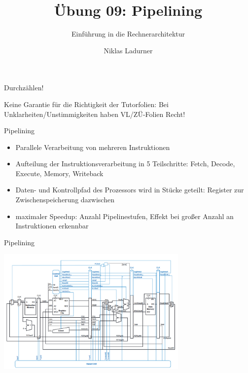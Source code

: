 \documentclass[
  german,            %
  aspectratio=169,    %
]{tumbeamer}
\title{Übung 09: Pipelining}
\subtitle{Einführung in die Rechnerarchitektur}
\author{Niklas Ladurner}
\institute{\theChairName\\\theDepartmentName\\\theUniversityName}
\date{\DTMdisplaydate{2023}{12}{15}{-1}}
\begin{document}
\maketitle

\begin{frame}[c]{}{}
  \begin{center}
    \LARGE  Durchzählen!
  \end{center}
\end{frame}

\begin{frame}[c]{}{}
  \begin{center}
    \LARGE  Keine Garantie für die Richtigkeit der Tutorfolien: Bei Unklarheiten/Unstimmigkeiten
    haben VL/ZÜ-Folien Recht!
  \end{center}
\end{frame}

\begin{frame}[fragile, c]{Pipelining}{}
  \begin{itemize}
    \item Parallele Verarbeitung von mehreren Instruktionen
    \item Aufteilung der Instruktionsverarbeitung in 5 Teilschritte: Fetch, Decode, Execute, Memory, Writeback
    \item Daten- und Kontrollpfad des Prozessors wird in Stücke geteilt: Register zur Zwischenspeicherung dazwischen
    \item maximaler Speedup: Anzahl Pipelinestufen, Effekt bei großer Anzahl an Instruktionen erkennbar
  \end{itemize}

\end{frame}

\begin{frame}[fragile, c]{Pipelining}{}
  \begin{center}
    \includegraphics[width=0.7\textwidth]{w09_pipelined.png}
  \end{center}
\end{frame}
\end{document}
